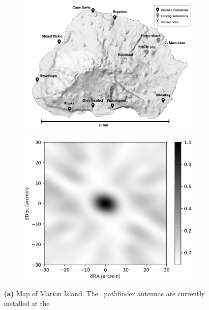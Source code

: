 \begin{figure}
	\centering
	\begin{subfigure}[t]{0.6\textwidth}
		\centering
		\includegraphics[width=\linewidth]{Figures/marion_map_annotated.jpg} 
		\caption{} \label{Fig:marion_map}
	\end{subfigure}
	\hfill
	\begin{subfigure}[t]{0.39\textwidth}
		\centering
		\includegraphics[width=\linewidth]{Figures/marion_beam_huts_2020.jpg}
		\caption{} \label{Fig:marion_beam}
	\end{subfigure}
	\caption{{\bf (a)} Map of Marion Island.  The
		\albatros\ pathfinder antennas are currently installed at the
}
\end{figure}
